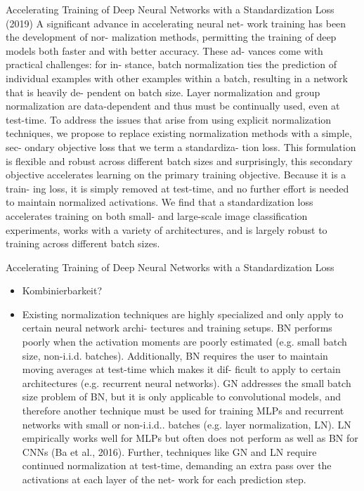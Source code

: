 \documentclass[10pt]{beamer}
\begin{document}
\begin{frame}{Accelerating Training of Deep Neural Networks with a Standardization Loss (2019)}
 A significant advance in accelerating neural net-
work training has been the development of nor-
malization methods, permitting the training of deep models
both faster and with better accuracy. These ad-
vances come with practical challenges: for in-
stance, batch normalization ties the prediction of
individual examples with other examples within
a batch, resulting in a network that is heavily de-
pendent on batch size. Layer normalization and
group normalization are data-dependent and thus
must be continually used, even at test-time. To
address the issues that arise from using explicit
normalization techniques, we propose to replace
existing normalization methods with a simple, sec-
ondary objective loss that we term a standardiza-
tion loss. This formulation is flexible and robust
across different batch sizes and surprisingly, this
secondary objective accelerates learning on the
primary training objective. Because it is a train-
ing loss, it is simply removed at test-time, and no
further effort is needed to maintain normalized
activations. We find that a standardization loss
accelerates training on both small- and large-scale
image classification experiments, works with a
variety of architectures, and is largely robust to
training across different batch sizes.
\end{frame}

\begin{frame}{Accelerating Training of Deep Neural Networks with a Standardization Loss}
 \begin{itemize}
  \item Kombinierbarkeit?
  \item Existing normalization techniques are highly
specialized and only apply to certain neural network archi-
tectures and training setups. BN performs poorly when the activation moments are poorly estimated (e.g. small batch
size, non-i.i.d. batches). Additionally, BN requires the user
to maintain moving averages at test-time which makes it dif-
ficult to apply to certain architectures (e.g. recurrent neural
networks). GN addresses the small batch size problem of
BN, but it is only applicable to convolutional models, and
therefore another technique must be used for training MLPs
and recurrent networks with small or non-i.i.d.. batches
(e.g. layer normalization, LN). LN empirically works well
for MLPs but often does not perform as well as BN for
CNNs (Ba et al., 2016). Further, techniques like GN and
LN require continued normalization at test-time, demanding
an extra pass over the activations at each layer of the net-
work for each prediction step.
 \end{itemize}

\end{frame}
\end{document}
